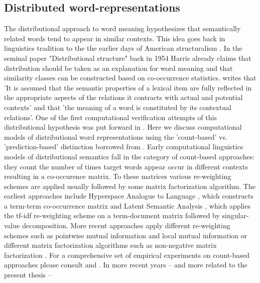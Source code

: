 \subsection{Distributed word-representations}
\label{sec:words}
The distributional approach to word meaning hypothesizes that semantically related words
tend to appear in similar contexts. This idea goes back in linguistics tradition to the the
earlier days of American structuralism \cite{nevin2002legacy}. In the seminal paper
"Distributional structure" \cite{harris1954distributional} back in 1954 Harris already claims
that distribution should be taken as an explanation for word meaning and that similarity classes
can be constructed based on co-occurrence statistics.
\cite{cruse1986lexical} writes that 'It is  assumed  that  the  semantic properties  of
a lexical  item  are  fully  reflected  in  the  appropriate  aspects  of  the  relations
it  contracts  with  actual  and  potential  contexts' and that 'the  meaning  of  a word
is constituted  by  its  contextual  relations'. One of the first computational verification
attempts of  this distributional hypothesis was put forward in \cite{miller1991contextual} .
Here we discuss computational models of distributional word representations using the 'count-based' vs.
'prediction-based' distinction borrowed from \cite{baroni2014don}.
Early computational linguistics models of distributional semantics fall in the category of count-based approaches:
they count the number of times target words appear occur in different contexts resulting in a co-occurence matrix.
To these matrices various re-weighting schemes are applied usually followed by some matrix factorization algorithm.
The earliest approaches include Hyperspace Analogue to Language \cite{lund1996producing},
which constructs a term-term co-occurrence matrix and Latent Semantic Analysis \cite{dumais2004latent},
which applies the tf-idf re-weighting scheme on a term-document matrix followed by singular-value decomposition.
More recent approaches apply different re-weighting schemes such as pointwise mutual information and local mutual
information \cite{evert2005statistics} or different matrix factorization algorithms such as non-negative
matrix factorization \cite{baroni2014don}. For a comprehensive set of empirical experiments on count-based
approaches please consult \cite{bullinaria2007extracting} and \cite{bullinaria2012extracting}.
In more recent years -- and more related to the present thesis --
